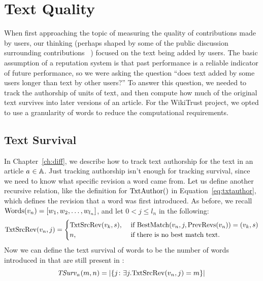 \section{Text Quality}
\label{sec:textquality}

When first approaching the topic of measuring the quality
of contributions made by users, our thinking (perhaps shaped
by some of the public discussion surrounding
contributions~\cite{Swartz2006} )
focused on the text being added by users.
The basic assumption of a reputation system is that past performance
is a reliable indicator of future performance, so we were
asking the question ``does text added by some users 
longer than text by other users?''
To answer this question, we needed to track the authorship of
units of text, and then compute how much of the original text
survives into later versions of an article.
For the WikiTrust project, we opted to use a granularity of words
to reduce the computational requirements.

\subsection{Text Survival}

In Chapter~\ref{ch:diff}, we describe how to track text authorship
for the text in an article $a_{} \in \mathbb{A}$.
Just tracking authorship isn't enough for tracking survival, since
we need to know what specific revision a word came from.
Let us define another recursive relation, like the definition
for $\mathrm{TxtAuthor}()$ in Equation~\ref{eq:txtauthor},
which defines the revision that a word was first introduced.
As before, we recall
$\mathrm{Words}(v_{n}) = \left[ w_1, w_2, \ldots, w_{l_n} \right]$, and let $0 < j \le l_n$ in the following:
\begin{equation*}
\mathrm{TxtSrcRev}(v_{n}, j) =
    \begin{cases}
        \mathrm{TxtSrcRev}(v_{k}, s), & \text{ if }
        \mathrm{BestMatch}(v_{n}, j, \mathrm{PrevRevs}(v_{n})) = (v_{k}, s) \\
        n, & \text{ if there is no best match text. } \\
    \end{cases}
\end{equation*}
Now we can define the text survival of words to be the number of
words introduced in  that are still present in :
\begin{equation}
\tsurv{\article{}}{m,n} = \left| \left\{ j \colon
    \exists j . \txtsrcrev{\version{n},j} = m \right\} \right| \\
\label{eq:tsurv}
\end{equation}

